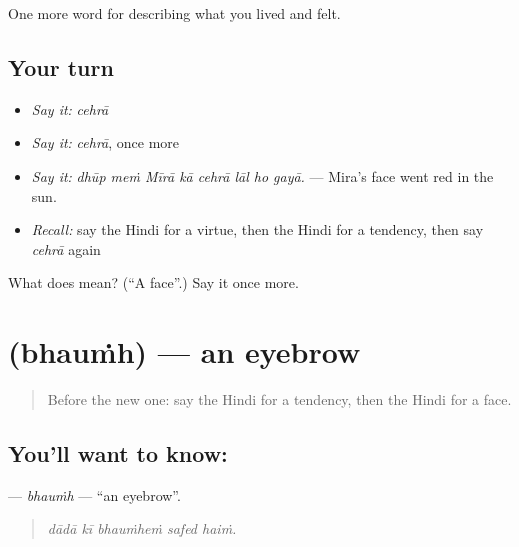 \begin{grammarlens}[title={What you've built}]
One more word for describing what you lived and felt.
\end{grammarlens}

\subsection*{Your turn}
\begin{itemize}
\raggedright
  \item \emph{Say it:} \emph{cehrā}
  \item \emph{Say it:} \emph{cehrā}, once more
  \item \emph{Say it:} \emph{dhūp meṁ Mīrā kā cehrā lāl ho gayā.} — Mira's face went red in the sun.
  \item \emph{Recall:} say the Hindi for a virtue, then the Hindi for a tendency, then say \emph{cehrā} again
\end{itemize}

\begin{tcolorbox}[breakable,colback=teal!4,colframe=teal!35!black,title={Before you move on}]
What does  mean? (\textquotedblleft{}A face\textquotedblright{}.) Say it once more.
\end{tcolorbox}
\section[\texorpdfstring{\hi{भौंह} (bhauṁh)}{भौंह (bhauṁh)}]{ (bhauṁh) — an eyebrow}

\label{lesson:HI-C476-bhaumh}



\begin{quote}
Before the new one: say the Hindi for a tendency, then the Hindi for a face.
\end{quote}

\subsection*{You'll want to know: }
\textbf{} — \emph{bhauṁh} — \textquotedblleft{}an eyebrow\textquotedblright{}.

\begin{quote}
    
\end{quote}

\begin{quote}
\emph{dādā kī bhauṁheṁ safed haiṁ.}
\end{quote}

